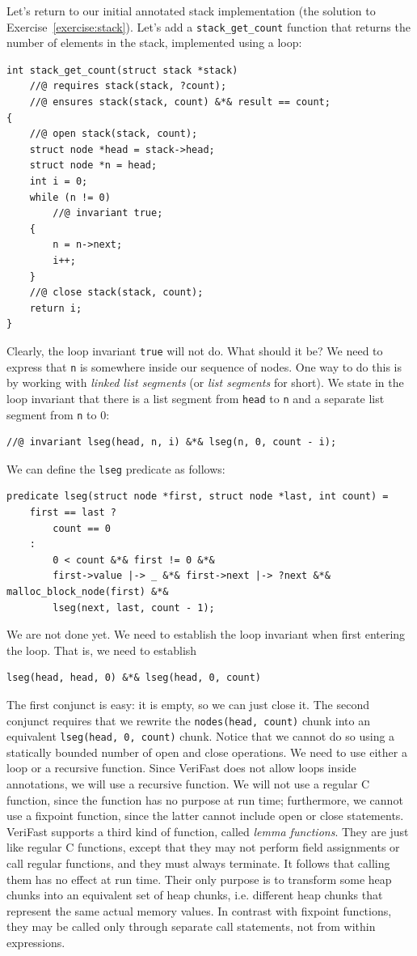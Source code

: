 \documentclass{article}
\begin{document}
Let's return to our initial annotated stack implementation (the
solution to Exercise~\ref{exercise:stack}). Let's add a
\lstinline!stack_get_count! function that returns the number of
elements in the stack, implemented using a loop:
\begin{lstlisting}
int stack_get_count(struct stack *stack)
    //@ requires stack(stack, ?count);
    //@ ensures stack(stack, count) &*& result == count;
{
    //@ open stack(stack, count);
    struct node *head = stack->head;
    struct node *n = head;
    int i = 0;
    while (n != 0)
        //@ invariant true;
    {
        n = n->next;
        i++;
    }
    //@ close stack(stack, count);
    return i;
}
\end{lstlisting}
Clearly, the loop invariant \lstinline!true! will not do. What
should it be? We need to express that \lstinline!n! is
somewhere inside our sequence of nodes. One way to do this is
by working with \emph{linked list segments} (or \emph{list
segments} for short). We state in the loop invariant that there
is a list segment from \lstinline!head! to \lstinline!n! and a
separate list segment from \lstinline!n! to 0:
\begin{lstlisting}
//@ invariant lseg(head, n, i) &*& lseg(n, 0, count - i);
\end{lstlisting}
We can define the \lstinline!lseg! predicate as follows:
\begin{lstlisting}
predicate lseg(struct node *first, struct node *last, int count) =
    first == last ?
        count == 0
    :
        0 < count &*& first != 0 &*&
        first->value |-> _ &*& first->next |-> ?next &*& malloc_block_node(first) &*&
        lseg(next, last, count - 1);
\end{lstlisting}
We are not done yet. We need to establish the loop invariant
when first entering the loop. That is, we need to establish
\begin{lstlisting}
lseg(head, head, 0) &*& lseg(head, 0, count)
\end{lstlisting}
The first conjunct is easy: it is empty, so we can just close
it. The second conjunct requires that we rewrite the
\lstinline!nodes(head, count)! chunk into an equivalent
\lstinline!lseg(head, 0, count)! chunk. Notice that we cannot
do so using a statically bounded number of open and close
operations. We need to use either a loop or a recursive
function. Since VeriFast does not allow loops inside
annotations, we will use a recursive function. We will not use
a regular C function, since the function has no purpose at run
time; furthermore, we cannot use a fixpoint function, since the
latter cannot include open or close statements. VeriFast
supports a third kind of function, called \emph{lemma
functions}. They are just like regular C functions, except that
they may not perform field assignments or call regular
functions, and they must always terminate. It follows that
calling them has no effect at run time. Their only purpose is
to transform some heap chunks into an equivalent set of heap
chunks, i.e. different heap chunks that represent the same
actual memory values. In contrast with fixpoint functions, they
may be called only through separate call statements, not from
within expressions.
\end{document}
